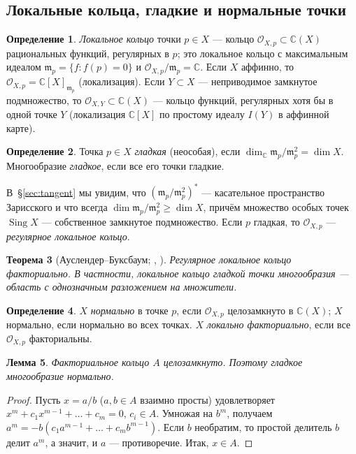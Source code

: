 \documentclass[11pt,a4paper]{article}
\theoremstyle{plain}
\newtheorem{theorem}{Теорема}[section]
\newtheorem{lemma}[theorem]{Лемма}
\theoremstyle{definition}
\newtheorem{definition}[theorem]{Определение}
\theoremstyle{remark}
\renewcommand{\C}{\mathbb{C}}
\newcommand{\cO}{\mathcal{O}}
\newcommand{\mm}{\mathfrak{m}}
\DeclareMathOperator{\Sing}{Sing}
\begin{document}
\subsection{Локальные кольца, гладкие и нормальные точки}

\begin{definition}
\emph{Локальное кольцо} точки $p\in X$ --- кольцо $\cO_{X,p}\subset\C(X)$ рациональных функций,
регулярных в $p$; это локальное кольцо с максимальным идеалом $\mm_p=\{f: f(p)=0\}$ и
$\cO_{X,p}/\mm_p=\C$. Если $X$ аффинно, то $\cO_{X,p}=\C[X]_{\mm_p}$ (локализация).
Если $Y\subset X$ --- неприводимое замкнутое подмножество, то $\cO_{X,Y}\subset \C(X)$ ---
кольцо функций, регулярных хотя бы в одной точке $Y$ (локализация $\C[X]$ по простому идеалу
$I(Y)$ в аффинной карте).
\end{definition}

\begin{definition}
Точка $p\in X$ \emph{гладкая} (неособая), если $\dim_\C \mm_p/\mm_p^2=\dim X$. Многообразие
\emph{гладкое}, если все его точки гладкие.
\end{definition}

В~\S\ref{sec:tangent} мы увидим, что $(\mm_p/\mm_p^2)^*$ --- касательное пространство Зарисского и
что всегда $\dim \mm_p/\mm_p^2\ge \dim X$, причём множество особых точек $\Sing X$ --- собственное
замкнутое подмножество. Если $p$ гладкая, то $\cO_{X,p}$ --- \emph{регулярное локальное кольцо}.

\begin{theorem}[{Ауслендер--Буксбаум; \cite[II.3, Теорема 1]{Sh}, \cite[II.6.11.1A]{Ha}}]\label{thm:UFD}
Регулярное локальное кольцо факториально. В частности, локальное кольцо гладкой точки
многообразия --- область с однозначным разложением на множители.
\end{theorem}

\begin{definition}
$X$ \emph{нормально} в точке $p$, если $\cO_{X,p}$ целозамкнуто в $\C(X)$; $X$ нормально, если
нормально во всех точках. $X$ \emph{локально факториально}, если все $\cO_{X,p}$ факториальны.
\end{definition}

\begin{lemma}
Факториальное кольцо $A$ целозамкнуто. Поэтому гладкое многообразие нормально.
\end{lemma}
\begin{proof}
Пусть $x=a/b$ ($a,b\in A$ взаимно просты) удовлетворяет
$x^m+c_1x^{m-1}+\dots+c_m=0$, $c_i\in A$. Умножая на $b^m$, получаем
$a^m=-b(c_1a^{m-1}+\dots+c_mb^{m-1})$. Если $b$ необратим, то простой делитель $b$ делит $a^m$,
а значит, и $a$ --- противоречие. Итак, $x\in A$.
\end{proof}
\end{document}
